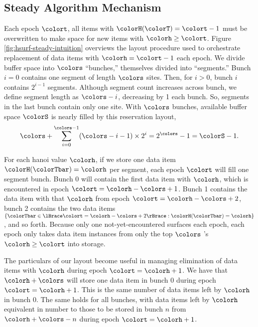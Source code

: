 \subsection{Steady Algorithm Mechanism}
\label{sec:steady-mechanism}



Each epoch $\colort$, all items with $\colorH(\colorT) = \colort - 1$ must be overwritten to make space for new items with \hv{} $\colorh \geq \colort$.
Figure \ref{fig:hsurf-steady-intuition} overviews the layout procedure used to orchestrate replacement of data items with \hv{} $\colorh = \colort - 1$ each epoch.
We divide buffer space into $\colors$ ``bunches,'' themselves divided into ``segments.''
Bunch $i=0$ contains one segment of length $\colors$ sites.
Then, for $i > 0$, bunch $i$ contains $2^{i-1}$ segments.
Although segment count increases across bunch, we define segment length as $\colors - i$, decreasing by 1 each bunch.
So, segments in the last bunch contain only one site.
With $\colors$ bunches, available buffer space $\colorS$ is nearly filled by this reservation layout,
\begin{align*}
\colors + \sum_{i=0}^{\colors-1} (\colors - i - 1) \times 2^{i} = 2^{\colors} - 1 = \colorS - 1.
\end{align*}

For each hanoi value $\colorh$, if we store one data item $\colorH(\colorTbar) = \colorh$ per segment, each epoch $\colort$ will fill one segment bunch.
Bunch 0 will contain the first data item with \hv{} $\colorh$, which is encountered in epoch $\colort=\colorh - \colors + 1$.
Bunch 1 contains the data item with that \hv{} $\colorh$ from epoch $\colort=\colorh - \colors + 2$, bunch 2 contains the two data items $\{ \colorTbar \in \lBrace \colort = \colorh - \colors + 2 \rBrace : \colorH(\colorTbar) = \colorh \}$, and so forth.
Because only one not-yet-encountered \hv{} surfaces each epoch, each epoch only takes data item instances from only the top $\colors$ \hv's $\colorh \geq \colort$ into storage.



The particulars of our layout become useful in managing elimination of data items with \hv{} $\colorh$ during epoch $\colort=\colorh + 1$.
We have that \hv{} $\colorh + \colors$ will store one data item in bunch 0 during epoch $\colort=\colorh + 1$.
This is the same number of data items left by \hv{} $\colorh$ in bunch 0.
The same holds for all bunches, with data items left by \hv{} $\colorh$ equivalent in number to those to be stored in bunch $n$ from \hv{} $\colorh + \colors - n$ during epoch $\colort = \colorh + 1$.

